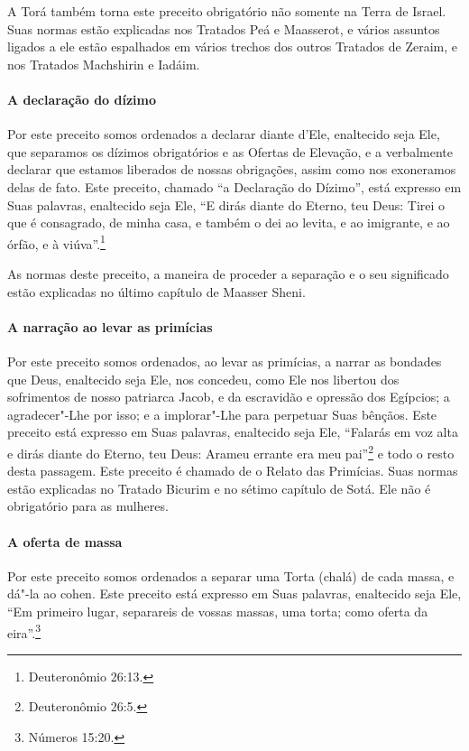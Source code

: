 \begin{multicols}{2}
A Torá\starr{} também torna este preceito obrigatório não somente na Terra de
Israel. Suas normas estão explicadas nos Tratados Peá\starr{} e Maasserot\starr, e
vários assuntos ligados a ele estão espalhados em vários trechos dos
outros Tratados de Zeraim\starr, e nos Tratados Machshirin\starr{} e Iadáim\starr.

\paragraph{A declaração do dízimo}

Por este preceito somos ordenados a declarar diante d'Ele, enaltecido
seja Ele, que separamos os dízimos obrigatórios e as Ofertas de
Elevação, e a verbalmente declarar que estamos liberados de nossas
obrigações, assim como nos exoneramos delas de fato. Este preceito,
chamado ``a Declaração do Dízimo'', está expresso em Suas palavras,
enaltecido seja Ele, ``E dirás diante do Eterno, teu Deus: Tirei o que é
consagrado, de minha casa, e também o dei ao levita\starr, e ao imigrante, e
ao órfão, e à viúva''.\footnote{Deuteronômio 26:13.}

As normas deste preceito, a maneira de proceder a separação e o seu
significado estão explicadas no último capítulo de Maasser Sheni\starr.


\paragraph{A narração ao levar as primícias}

Por este preceito somos ordenados, ao levar as primícias, a narrar as
bondades que Deus, enaltecido seja Ele, nos concedeu, como Ele nos
libertou dos sofrimentos de nosso patriarca Jacob\starr, e da escravidão e
opressão dos Egípcios; a agradecer"-Lhe por isso; e a implorar"-Lhe para
perpetuar Suas bênçãos. Este preceito está expresso em Suas palavras,
enaltecido seja Ele, ``Falarás em voz alta e dirás diante do Eterno, teu
Deus: Arameu errante era meu pai''\footnote{Deuteronômio 26:5.} e todo o resto
desta passagem. Este preceito é chamado de o Relato das Primícias. Suas
normas estão explicadas no Tratado Bicurim\starr{} e no sétimo capítulo de Sotá\starr.
Ele não é obrigatório para as mulheres.

\paragraph{A oferta de massa}

Por este preceito somos ordenados a separar uma Torta (chalá\starr) de cada
massa, e dá"-la ao cohen\starr{}. Este preceito está expresso em Suas
palavras, enaltecido seja Ele, ``Em primeiro lugar, separareis de vossas
massas, uma torta; como oferta da eira''.\footnote{Números 15:20.}


\end{multicols}
